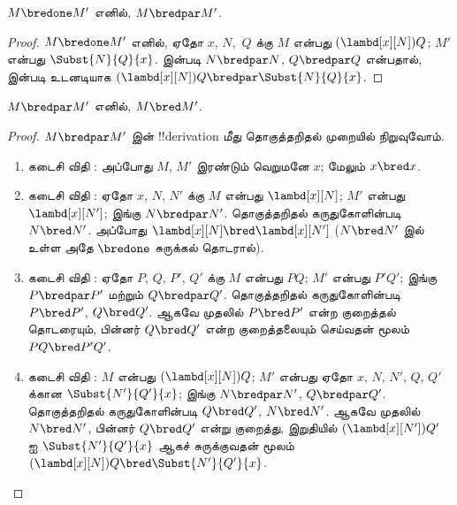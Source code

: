 \documentclass[../../../include/open-logic-section]{subfiles}
\begin{document}


\begin{lem}
  $M \bredone M'$ எனில், $M \bredpar M'$.
\end{lem}
\begin{proof} $M \bredone M'$ எனில், ஏதோ $x$, $N$,~$Q$ க்கு $M$ என்பது
    $(\lambd[x][N])Q$; $M'$ என்பது $\Subst{N}{Q}{x}$.
     இன்படி $N \bredpar N$, $Q \bredpar Q$ என்பதால்,
     இன்படி உடனடியாக
    $(\lambd[x][N])Q \bredpar \Subst{N}{Q}{x}$.
\end{proof}

\begin{lem}
  $M \bredpar M'$ எனில், $M \bred M'$.
\end{lem}

\begin{proof} $M \bredpar M'$ இன் !!{derivation} மீது தொகுத்தறிதல் முறையில்
  நிறுவுவோம்.
  \begin{enumerate}
  \item கடைசி விதி : அப்போது $M$, $M'$ இரண்டும்
    வெறுமனே $x$; மேலும் $x \bred x$.
  \item கடைசி விதி : ஏதோ $x$, $N$, $N'$ க்கு
    $M$ என்பது $\lambd[x][N]$; $M'$ என்பது $\lambd[x][N']$; இங்கு
    $N \bredpar N'$. தொகுத்தறிதல் கருதுகோளின்படி $N \bred N'$. அப்போது
    $\lambd[x][N] \bred \lambd[x][N']$ ($N \bred N'$ இல் உள்ள அதே
    $\bredone$ சுருக்கல் தொடரால்).
  \item கடைசி விதி : ஏதோ $P$, $Q$, $P'$, $Q'$
    க்கு $M$ என்பது $PQ$; $M'$ என்பது $P'Q'$; இங்கு $P \bredpar P'$
    மற்றும் $Q \bredpar Q'$. தொகுத்தறிதல் கருதுகோளின்படி
    $P \bred P'$, $Q \bred Q'$. ஆகவே முதலில் $P \bred P'$ என்ற
    குறைத்தல் தொடரையும், பின்னர் $Q \bred Q'$ என்ற குறைத்தலையும் செய்வதன்
    மூலம் $PQ \bred P'Q'$.
  \item கடைசி விதி : $M$ என்பது
    $(\lambd[x][N])Q$; $M'$ என்பது ஏதோ $x$, $N$, $N'$, $Q$, $Q'$ க்கான
    $\Subst{N'}{Q'}{x}$; இங்கு $N \bredpar N'$, $Q \bredpar Q'$.
    தொகுத்தறிதல் கருதுகோளின்படி $Q \bred Q'$, $N \bred N'$. ஆகவே முதலில்
    $N \bred N'$, பின்னர் $Q \bred Q'$ என்று குறைத்து, இறுதியில்
    $(\lambd[x][N'])Q'$ ஐ $\Subst{N'}{Q'}{x}$ ஆகச் சுருக்குவதன் மூலம்
    $(\lambd[x][N])Q \bred \Subst{N'}{Q'}{x}$.
  \end{enumerate}
\end{proof}
\end{document}
